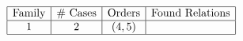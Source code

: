 \begin{table}[h]
	\centering
	$\begin{array}{|c|c|c|c|}
		\hline
		\text{Family} & \text{\# Cases} & \text{Orders} & \text{Found Relations} \\
		\hline
		1 & 2 & (4, 5) &  \\
		\hline
	\end{array}$
\end{table}
